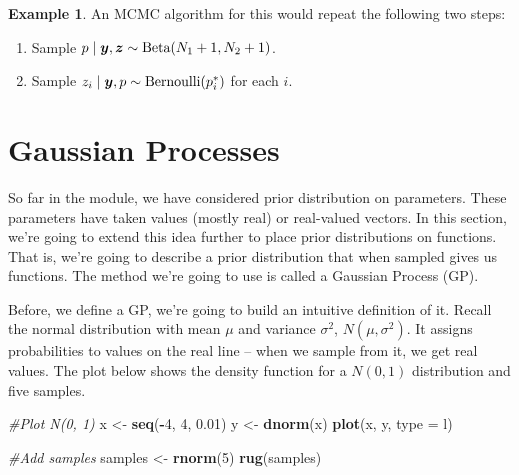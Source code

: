 \documentclass[
]{book}
\newenvironment{Shaded}{\begin{snugshade}}{\end{snugshade}}
\newcommand{\AttributeTok}[1]{\textcolor[rgb]{0.13,0.29,0.53}{#1}}
\newcommand{\CommentTok}[1]{\textcolor[rgb]{0.56,0.35,0.01}{\textit{#1}}}
\newcommand{\DecValTok}[1]{\textcolor[rgb]{0.00,0.00,0.81}{#1}}
\newcommand{\FloatTok}[1]{\textcolor[rgb]{0.00,0.00,0.81}{#1}}
\newcommand{\FunctionTok}[1]{\textcolor[rgb]{0.13,0.29,0.53}{\textbf{#1}}}
\newcommand{\NormalTok}[1]{#1}
\newcommand{\OtherTok}[1]{\textcolor[rgb]{0.56,0.35,0.01}{#1}}
\newcommand{\SpecialCharTok}[1]{\textcolor[rgb]{0.81,0.36,0.00}{\textbf{#1}}}
\newcommand{\StringTok}[1]{\textcolor[rgb]{0.31,0.60,0.02}{#1}}
\providecommand{\tightlist}{%
  \setlength{\itemsep}{0pt}\setlength{\parskip}{0pt}}
\theoremstyle{definition}
\theoremstyle{definition}
\newtheorem{example}{Example}[chapter]
\theoremstyle{definition}
\theoremstyle{definition}
\theoremstyle{remark}
\begin{document}
\begin{example}
An MCMC algorithm for this would repeat the following two steps:

\begin{enumerate}
\def\labelenumi{\arabic{enumi}.}
\tightlist
\item
  Sample \(p \mid \boldsymbol{y}, \boldsymbol{z} \sim \hbox{Beta}(N_1 + 1, N_2 + 1)\).
\item
  Sample \(z_i \mid \boldsymbol{y}, p \sim \hbox{Bernoulli}(p^*_i)\) for each \(i\).
\end{enumerate}

\end{example}

\hypertarget{gaussian-processes}{%
\section{Gaussian Processes}\label{gaussian-processes}}

So far in the module, we have considered prior distribution on parameters. These parameters have taken values (mostly real) or real-valued vectors. In this section, we're going to extend this idea further to place prior distributions on functions. That is, we're going to describe a prior distribution that when sampled gives us functions. The method we're going to use is called a Gaussian Process (GP).

Before, we define a GP, we're going to build an intuitive definition of it. Recall the normal distribution with mean \(\mu\) and variance \(\sigma^2\), \(N(\mu, \sigma^2)\). It assigns probabilities to values on the real line -- when we sample from it, we get real values. The plot below shows the density function for a \(N(0, 1)\) distribution and five samples.

\begin{Shaded}
\begin{Highlighting}[]
\CommentTok{\#Plot N(0, 1)}
\NormalTok{x }\OtherTok{\textless{}{-}} \FunctionTok{seq}\NormalTok{(}\SpecialCharTok{{-}}\DecValTok{4}\NormalTok{, }\DecValTok{4}\NormalTok{, }\FloatTok{0.01}\NormalTok{)}
\NormalTok{y }\OtherTok{\textless{}{-}} \FunctionTok{dnorm}\NormalTok{(x)}
\FunctionTok{plot}\NormalTok{(x, y, }\AttributeTok{type =} \StringTok{\textquotesingle{}l\textquotesingle{}}\NormalTok{)}

\CommentTok{\#Add samples}
\NormalTok{samples }\OtherTok{\textless{}{-}} \FunctionTok{rnorm}\NormalTok{(}\DecValTok{5}\NormalTok{)}
\FunctionTok{rug}\NormalTok{(samples)}
\end{Highlighting}
\end{Shaded}
\end{document}

